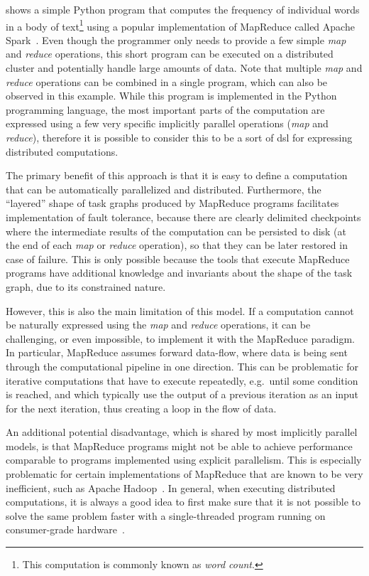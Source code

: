  shows a simple Python program that computes the frequency of
individual words in a body of text\footnote{This computation is commonly known as \emph{word count}.} using a popular implementation of
MapReduce called Apache Spark~\cite{spark}. Even though the programmer only needs to
provide a few simple \emph{map} and \emph{reduce} operations, this short
program can be executed on a distributed cluster and potentially handle large amounts of data. Note
that multiple \emph{map} and \emph{reduce} operations can be combined in a
single program, which can also be observed in this example. While this program is implemented in
the Python programming language, the most important parts of the computation are expressed using a
few very specific implicitly parallel operations (\emph{map} and
\emph{reduce}), therefore it is possible to consider this to be a sort of
\gls{dsl} for expressing distributed computations.

The primary benefit of this approach is that it is easy to define a computation that can be
automatically parallelized and distributed. Furthermore, the ``layered'' shape of task graphs
produced by MapReduce programs facilitates implementation of fault tolerance, because there are
clearly delimited checkpoints where the intermediate results of the computation can be persisted to
disk (at the end of each \emph{map} or \emph{reduce} operation), so that
they can be later restored in case of failure. This is only possible because the tools that execute
MapReduce programs have additional knowledge and invariants about the shape of the task graph, due
to its constrained nature.

However, this is also the main limitation of this model. If a computation cannot be naturally
expressed using the \emph{map} and \emph{reduce} operations, it can be
challenging, or even impossible, to implement it with the MapReduce paradigm. In particular,
MapReduce assumes forward data-flow, where data is being sent through the computational pipeline in
one direction. This can be problematic for iterative computations that have to execute repeatedly,
e.g.\ until some condition is reached, and which typically use the output of a previous iteration
as an input for the next iteration, thus creating a loop in the flow of data.

An additional potential disadvantage, which is shared by most implicitly parallel models, is that
MapReduce programs might not be able to achieve performance comparable to programs implemented
using explicit parallelism. This is especially problematic for certain implementations of MapReduce
that are known to be very inefficient, such as Apache Hadoop~\cite{hadoop}. In general,
when executing distributed computations, it is always a good idea to first make sure that it is not
possible to solve the same problem faster with a single-threaded program running on consumer-grade
hardware~\cite{cost}.

